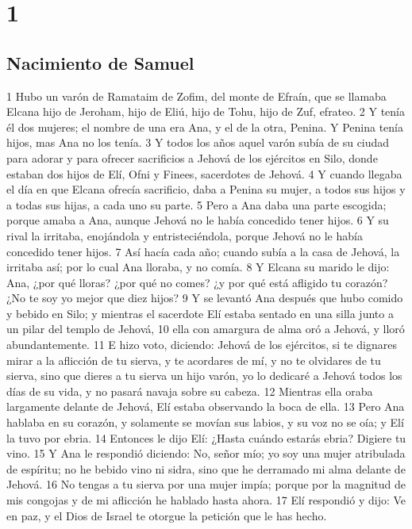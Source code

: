 
\chapter{1}

\section*{Nacimiento de Samuel}

1 Hubo un varón de Ramataim de Zofim, del monte de Efraín, que se llamaba Elcana hijo de Jeroham, hijo de Eliú, hijo de Tohu, hijo de Zuf, efrateo.
2 Y tenía él dos mujeres; el nombre de una era Ana, y el de la otra, Penina. Y Penina tenía hijos, mas Ana no los tenía.
3 Y todos los años aquel varón subía de su ciudad para adorar y para ofrecer sacrificios a Jehová de los ejércitos en Silo, donde estaban dos hijos de Elí, Ofni y Finees, sacerdotes de Jehová.
4 Y cuando llegaba el día en que Elcana ofrecía sacrificio, daba a Penina su mujer, a todos sus hijos y a todas sus hijas, a cada uno su parte.
5 Pero a Ana daba una parte escogida; porque amaba a Ana, aunque Jehová no le había concedido tener hijos.
6 Y su rival la irritaba, enojándola y entristeciéndola, porque Jehová no le había concedido tener hijos.
7 Así hacía cada año; cuando subía a la casa de Jehová, la irritaba así; por lo cual Ana lloraba, y no comía.
8 Y Elcana su marido le dijo: Ana, ¿por qué lloras? ¿por qué no comes? ¿y por qué está afligido tu corazón? ¿No te soy yo mejor que diez hijos?
9 Y se levantó Ana después que hubo comido y bebido en Silo; y mientras el sacerdote Elí estaba sentado en una silla junto a un pilar del templo de Jehová,
10 ella con amargura de alma oró a Jehová, y lloró abundantemente.
11 E hizo voto, diciendo: Jehová de los ejércitos, si te dignares mirar a la aflicción de tu sierva, y te acordares de mí, y no te olvidares de tu sierva, sino que dieres a tu sierva un hijo varón, yo lo dedicaré a Jehová todos los días de su vida, y no pasará navaja sobre su cabeza. 
12 Mientras ella oraba largamente delante de Jehová, Elí estaba observando la boca de ella.
13 Pero Ana hablaba en su corazón, y solamente se movían sus labios, y su voz no se oía; y Elí la tuvo por ebria.
14 Entonces le dijo Elí: ¿Hasta cuándo estarás ebria? Digiere tu vino.
15 Y Ana le respondió diciendo: No, señor mío; yo soy una mujer atribulada de espíritu; no he bebido vino ni sidra, sino que he derramado mi alma delante de Jehová.
16 No tengas a tu sierva por una mujer impía; porque por la magnitud de mis congojas y de mi aflicción he hablado hasta ahora.
17 Elí respondió y dijo: Ve en paz, y el Dios de Israel te otorgue la petición que le has hecho.
